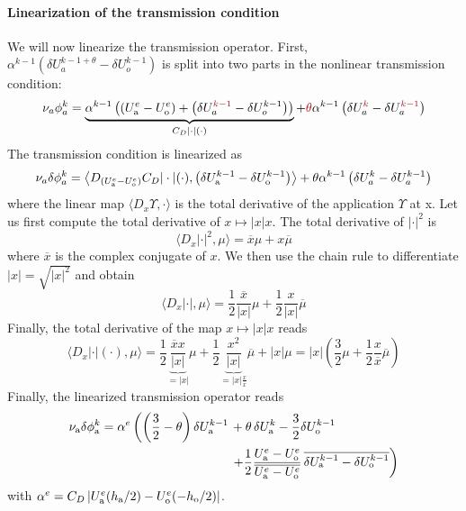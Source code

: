 \paragraph{Linearization of the transmission condition}
We will now linearize the transmission operator.
First, $\alpha^{k-1} \left(\delta U_a^{k-1+\theta}
- \delta U_o^{k-1}\right)$
is split into two parts in the nonlinear transmission condition:
\begin{equation}
	\nu_a \phi_a^k =
	\underbrace{
	\alpha^{k-1} \left(\left(U^e_{\rm a} - U^e_{\rm o}\right) +
	\left(\delta U_a^{\emphase{k-1}}
	- \delta U_o^{k-1}\right)\right)}_{C_D|\cdot|(\cdot)}
	+ \emphase{\theta} \alpha^{k-1}
	\left(\delta U_a^{\emphase{k}} - \delta U_a^{\emphase{k-1}}
	\right)
\end{equation}
The transmission condition is linearized as
\begin{equation}
	\nu_a \delta \phi_a^k = \left\langle
	D_{\left(U_{\rm a}^e - U_{\rm o}^e\right)}
	C_D |\cdot|(\cdot),
	\left(\delta U_{\rm a}^{k-1} -
	\delta U_{\rm o}^{k-1}
	\right)
	\right\rangle
	+ \theta \alpha^{k-1}
	\left(\delta U_a^{k} - \delta U_a^{k-1}
	\right)
\end{equation}
where the linear map $\langle D_x \Upsilon, \cdot \rangle$
is the total derivative of the application $\Upsilon$ at x.
Let us first compute the total derivative of $x\mapsto |x|x$.
The total derivative of $|\cdot|^2$ is
\begin{equation}
\langle D_x |\cdot|^2, \mu \rangle
= \overline{x} \mu + x \overline{\mu}
\end{equation}
where $\overline{x}$ is the complex conjugate of $x$.
We then use the chain rule to differentiate $|x| = \sqrt{|x|^2}$ and
obtain
\begin{equation}
\langle D_x |\cdot|, \mu \rangle =
\frac{1}{2} \frac{\overline{x}}{|x|} \mu
+ \frac{1}{2} \frac{x}{|x|} \overline{\mu}
\end{equation}
Finally, the total derivative of the map $x\mapsto |x|x$ reads
\begin{equation}
	\langle D_x |\cdot|(\cdot), \mu \rangle =
	\frac{1}{2} \underbrace{\frac{\overline{x}x}{|x|}}_{=|x|} \mu
	+ \frac{1}{2}
	\underbrace{\frac{x^2}{|x|}}_{=|x|\frac{x}{\overline{x}}}
	\overline{\mu}
	+ |x|\mu
	= |x| \left(\frac{3}{2}\mu + \frac{1}{2}\frac{x}{\overline{x}}
	\overline{\mu}\right)
\end{equation}
Finally, the linearized transmission operator reads
\begin{equation}
\label{eq:linearised}
\begin{aligned}
\nu_{\rm a}\delta\phi_{\rm a}^k = \alpha^e 
\left( \left(\frac{3}{2} - \theta \right)\delta U_{\rm a}^{k-1} \right.
&+ \theta\, \delta U_{\rm a}^{k}
- \frac{3}{2} \delta U_{\rm o}^{k-1}
\\
&\left.+ \frac{1}{2}\frac{U_{\rm a}^{{\color{black} e}} - U_{\rm o}^{{\color{black} e}}}
	{\overline{U_{\rm a}^{{\color{black} e}} - U_{\rm o}^{{\color{black} e}}}}\,
\overline{
\delta U_{\rm a}^{k-1} - \delta U_{\rm o}^{k-1}}
\right)
\end{aligned}
\end{equation}
with $\alpha^e=C_D\left|U_{\rm a}^e(h_{\rm a}/2) - U_{\rm o}^e(-h_{\rm o}/2)\right|$.
